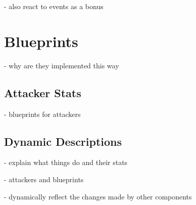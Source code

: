 - also react to events as a bonus

\section{Blueprints}

- why are they implemented this way

\subsection{Attacker Stats}

- blueprints for attackers

\subsection{Dynamic Descriptions}

- explain what things do and their stats

- attackers and blueprints

- dynamically reflect the changes made by other components
